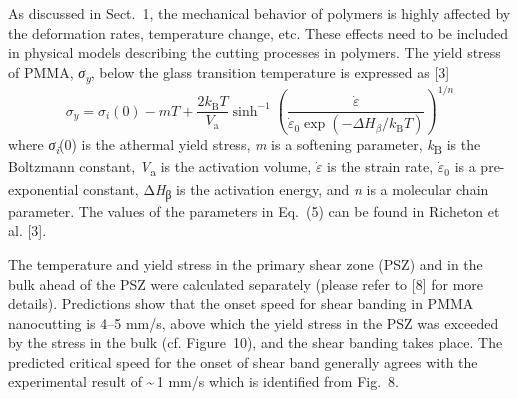 \documentclass{article}
\begin{document}
As discussed in Sect.~1, the mechanical behavior of polymers is highly affected by the deformation rates, temperature change, etc. These effects need to be included in physical models describing the cutting processes in polymers. The yield stress of PMMA, \emph{σ}\textsubscript{\emph{y}}, below the glass transition temperature is expressed as [3]
\begin{equation*}
\sigma_y = \sigma_i(0) - mT + \frac{2k_\mathrm{B}T}{V_\mathrm{a}}\sinh^{-1}\left(\frac{\dot{\varepsilon}}{\dot{\varepsilon}_0\exp\left(-\Delta H_\beta\big/k_\mathrm{B}T\right)}\right)^{1/n} \tag{6}
\end{equation*}
where \emph{σ}\textsubscript{\emph{i}}(0) is the athermal yield stress, \emph{m} is a softening parameter, \emph{k}\textsubscript{B} is the Boltzmann constant, \emph{V}\textsubscript{a} is the activation volume, $\dot{\varepsilon}$ is the strain rate, $\dot{\varepsilon}_0$ is a pre-exponential constant, Δ\emph{H}\textsubscript{β} is the activation energy, and \emph{n} is a molecular chain parameter. The values of the parameters in Eq.~(5) can be found in Richeton et al. [3].

The temperature and yield stress in the primary shear zone (PSZ) and in the bulk ahead of the PSZ were calculated separately (please refer to [8] for more details). Predictions show that the onset speed for shear banding in PMMA nanocutting is 4–5 mm/s, above which the yield stress in the PSZ was exceeded by the stress in the bulk (cf. Figure~10), and the shear banding takes place. The predicted critical speed for the onset of shear band generally agrees with the experimental result of \textasciitilde\,1 mm/s which is identified from Fig.~8.
\end{document}
